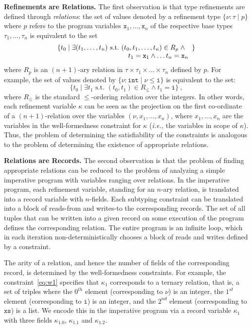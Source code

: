 \documentclass[nocopyrightspace]{sigplanconf}
\def\mypara#1{\smallskip\noindent\textbf{#1}}
\def\set#1{{\{ #1\}}}
\newcommand{\ie}{\textit{i.e.,}\xspace}
\newcommand{\ttxs}{\mathtt{xs}}
\newcommand{\ttx}{\mathtt{x}}
\newcommand{\tti}{\mathtt{i}}
\def\ttxs{\mathtt{xs}}
\def\valu{\nu}
\newcommand{\ftyp}[2]{{{#1}\!:\!{#2}}}
\newcommand{\kvar}{\kappa}
\def\ttint{\mathtt{int}}
\newcommand{\typ}{\tau}
\newcommand{\reftyp}[3]{\set{\ftyp{{#1}}{{#2}} \mid {#3}}}
\def\rkvar{{\kvar}}
\begin{document}
\mypara{Refinements are Relations.}
The first observation is that type refinements are defined through
{\em relations}: the set of values denoted by a refinement type 
$\reftyp{\valu}{\typ}{p}$ where $p$ refers to the program 
variables $\ttx_1,\ldots,\ttx_n$ 
of the respective base types $\typ_1,\ldots,\typ_n$ 
is equivalent to the set 
$$
\set{t_0 \mid \exists (t_1,\ldots,t_n) \mbox{ s.t.\ }
  \begin{array}[t]{@{}l}
    (t_0, t_1,\ldots,t_n) \in R_p \mathrel{\wedge} \\
    \quad t_1 = \ttx_1 \wedge \ldots t_n = \ttx_n
  \end{array}
}
$$
where $R_p$ is an $(n+1)$-ary relation in $\typ \times \typ_1\times\ldots\times \typ_n$ defined by 
$p$.
For example, the set of values denoted by 
$\reftyp{\valu}{\ttint}{\valu \leq \tti}$
is equivalent to the set:
$$\set{t_0 \mid \exists t_1 \mbox{ s.t.\ } (t_0, t_1) \in R_{\leq} \wedge t_1 = \tti}\ ,$$
where $R_\leq$ is the standard $\leq$-ordering relation over the integers.
In other words, each refinement variable $\kvar$ can be seen as 
the projection on the first co-ordinate of
a $(n+1)$-relation over the variables $(\valu, x_1,\ldots,x_n)$, 
where $x_1,\ldots,x_n$ are the variables in the well-formedness 
constraint for $\kvar$ (\ie the variables in scope of $\kvar$). 
Thus, the problem of determining the satisfiability of the constraints
is analogous to the problem of determining the existence of appropriate 
relations.

\mypara{Relations are Records.}
The second observation is that the problem of finding appropriate relations
can be reduced to the problem of analyzing a simple imperative program 
with variables ranging over relations.
In the imperative program, each refinement variable,
standing for an $n$-ary relation, is translated into a record variable with
$n$-fields. 
Each subtyping constraint can be translated into a block of reads-from 
and writes-to the corresponding records.
The set of all tuples that can be written into a 
given record on some execution of the program defines the corresponding relation. 
The entire program is an infinite loop, which in each iteration
non-deterministically chooses a block of reads and writes defined by 
a constraint.

The arity of a relation,
and hence the number of fields of the corresponding record, is determined by
the well-formedness constraints. 
For example, the constraint~\eqref{eq:w1} specifies that $\kvar_1$
corresponds to a ternary relation, that is, a set of triples 
where the $0^{th}$ element (corresponding to $\valu$) is an integer, 
the $1^{st}$ element (corresponding to $\tti$) is an integer, 
and the $2^{nd}$ element (corresponding to $\ttxs$) is a list.
We encode this in the imperative program via a record variable $\rkvar_1$
with three fields $\rkvar_1.0$, $\rkvar_1.1$ and $\rkvar_1.2$.
\end{document}
